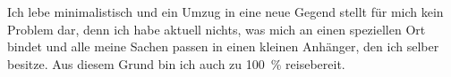 		Ich lebe minimalistisch und ein Umzug in eine neue Gegend stellt für mich kein Problem dar, denn ich habe aktuell nichts, was mich an einen speziellen Ort bindet und alle meine Sachen passen in einen kleinen Anhänger, den ich selber besitze.
		Aus diesem Grund bin ich auch zu \SI{100}{\percent} reisebereit.